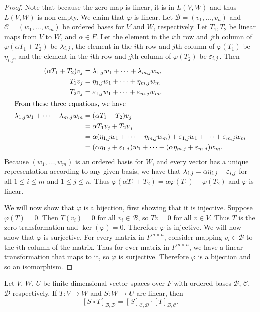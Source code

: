 \documentclass[class=article, crop=false]{standalone}
\begin{document}
  \begin{proof}
    Note that because the zero map is linear, it is in $L(V,W)$ and thus $L(V,W)$ is non-empty. We claim that $\varphi$ is linear. Let $\mathcal{B}=(v_1,\dotsc,v_n)$ and $\mathcal{C}=(w_1,\dotsc,w_m)$ be ordered bases for $V$ and $W$, respectively. Let $T_1, T_2$ be linear maps from $V$ to $W$, and $\alpha\in F$. Let the element in the $i$th row and $j$th column of $\varphi(\alpha T_1 + T_2)$ be $\lambda_{i,j}$, the element in the $i$th row and $j$th column of $\varphi(T_1)$ be $\eta_{i,j}$, and the element in the $i$th row and $j$th column of $\varphi(T_2)$ be $\varepsilon_{i,j}$. Then 
    \begin{align*}
      (\alpha T_1 + T_2)v_j &= \lambda_{1,j}w_1 + \dotsb + \lambda_{m,j}w_m \\
      T_1v_j &= \eta_{1,j}w_1 + \dotsb + \eta_{m,j}w_m \\
      T_2v_j &= \varepsilon_{1,j}w_1 + \dotsb + \varepsilon_{m,j}w_m. \\
      \intertext{From these three equations, we have}
      \lambda_{1,j}w_1 + \dotsb + \lambda_{m,j}w_m &= (\alpha T_1 + T_2)v_j \\
      &= \alpha T_1v_j + T_2v_j \\
      &= \alpha (\eta_{1,j}w_1 + \dotsb + \eta_{m,j}w_m) + \varepsilon_{1,j}w_1 + \dotsb + \varepsilon_{m,j}w_m \\
      &= (\alpha \eta_{1, j} + \varepsilon_{1, j})w_1 + \dotsb + (\alpha \eta_{m, j} + \varepsilon_{m, j})w_m.
    \end{align*}
    Because $(w_1,\dotsc,w_m)$ is an ordered basis for $W$, and every vector has a unique representation according to any given basis, we have that $\lambda_{i,j} = \alpha\eta_{i,j} + \varepsilon_{i,j}$ for all $1\leq i\leq m$ and $1\leq j\leq n$. Thus $\varphi(\alpha T_1 + T_2) = \alpha \varphi(T_1) + \varphi(T_2)$ and $\varphi$ is linear. \par
    We will now show that $\varphi$ is a bijection, first showing that it is injective. Suppose $\varphi(T) = 0$. Then $T(v_i) = 0$ for all $v_i\in \mathcal{B}$, so $Tv = 0$ for all $v\in V$. Thus $T$ is the zero transformation and $\ker(\varphi) = 0$. Therefore $\varphi$ is injective. We will now show that $\varphi$ is surjective. For every matrix in $F^{m\times n}$, consider mapping $v_i\in \mathcal{B}$ to the $i$th column of the matrix. Thus for ever matrix in $F^{m\times n}$, we have a linear transformation that maps to it, so $\varphi$ is surjective. Therefore $\varphi$ is a bijection and so an isomorphism.
  \end{proof}
  \begin{theorem}{12.2}
    Let $V$, $W$, $U$ be finite-dimensional vector spaces over $F$ with ordered bases $\mathcal{B}$, $\mathcal{C}$, $\mathcal{D}$ respectively. If $T\colon V\to W$ and $S\colon W\to U$ are linear, then
    \[
      [S\circ T]_{\mathcal{B}, \mathcal{D}} = [S]_{\mathcal{C},\mathcal{D}}\cdot [T]_{\mathcal{B},\mathcal{C}}.
    \]
  \end{theorem}
\end{document}
